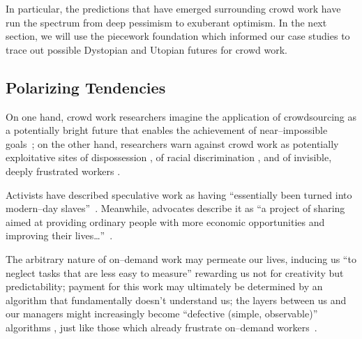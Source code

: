 \documentclass[trackingWork]{subfiles}
\begin{document}
In particular, the predictions that have emerged surrounding crowd work have run the spectrum
from deep pessimism to exuberant optimism. 
In the next section, we will use
the piecework foundation which informed our case studies
to trace out possible Dystopian and Utopian futures for crowd work.

\subsection{Polarizing Tendencies}\label{sec:polarizationOfCrowdWork}
On one hand, crowd work researchers
imagine the application of crowdsourcing as
a potentially bright future that enables the achievement of near--impossible goals~\cite{redballoon,crowdworkFuture,vizwiz}; %
on the other hand, researchers
warn against crowd work
as potentially exploitative sites
of dispossession \cite{scholz2012digital},
of racial discrimination \cite{edelman2015racial}, and
of invisible, deeply frustrated workers \cite{turkopticon,bighamHalfWorkday}.

Activists have described speculative work as having
``essentially been turned into modern--day slaves''~\cite{activistsHuffPoLawsuit}.
Meanwhile, advocates describe it as
``a project of sharing
aimed at providing ordinary people
with more economic opportunities and
improving their lives\dots''~\cite{uberPropaganda}.

The arbitrary nature of on--demand work may permeate our lives, inducing us
``to neglect tasks that are less easy to measure'' \cite{SJOE:SJOE371}
rewarding us not for creativity but predictability;
payment for this work may ultimately be determined by
an algorithm that fundamentally doesn't understand us;
the layers between us and our managers might increasingly become
``defective (simple, observable)'' algorithms \cite{10.2307/2555446},
just like those which already frustrate
on--demand workers~\cite{uberAlgorithm,dynamo,turkopticon}.
\end{document}
